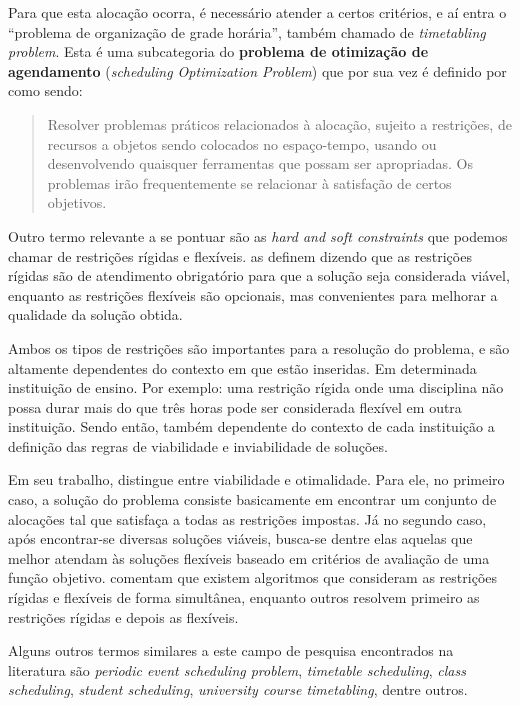Para que esta alocação ocorra, é necessário atender a certos critérios, e aí entra o ``problema de organização de grade horária'', também chamado de \textit{timetabling problem}. Esta é uma subcategoria do \textbf{problema de otimização de agendamento} (\textit{scheduling Optimization Problem}) \cite{Alencar2019} que por sua vez é definido por  como sendo:

\begin{quote}\footnotesize
  Resolver problemas práticos relacionados à alocação, sujeito a restrições, de recursos a objetos sendo colocados no espaço-tempo, usando ou desenvolvendo quaisquer ferramentas que possam ser apropriadas. Os problemas irão frequentemente se relacionar à satisfação de certos objetivos. \cite{Wren1996}
\end{quote}

Outro termo relevante a se pontuar são as \textit{hard and soft constraints} que podemos chamar de restrições rígidas e flexíveis.  as definem dizendo que as restrições rígidas são de atendimento obrigatório para que a solução seja considerada viável, enquanto as restrições flexíveis são opcionais, mas convenientes para melhorar a qualidade da solução obtida.

Ambos os tipos de restrições são importantes para a resolução do problema, e são altamente dependentes do contexto em que estão inseridas. Em determinada instituição de ensino. Por exemplo: uma restrição rígida onde uma disciplina não possa durar mais do que três horas pode ser considerada flexível em outra instituição. Sendo então, também dependente do contexto de cada instituição a definição das regras de viabilidade e inviabilidade de soluções.

Em seu trabalho,  distingue entre viabilidade e otimalidade. Para ele, no primeiro caso, a solução do problema consiste basicamente em encontrar um conjunto de alocações tal que satisfaça a todas as restrições impostas. Já no segundo caso, após encontrar-se diversas soluções viáveis, busca-se dentre elas aquelas que melhor atendam às soluções flexíveis baseado em critérios de avaliação de uma função objetivo.  comentam que existem algoritmos que consideram as restrições rígidas e flexíveis de forma simultânea, enquanto outros resolvem primeiro as restrições rígidas e depois as flexíveis.

Alguns outros termos similares a este campo de pesquisa encontrados na literatura são \textit{periodic event scheduling problem}, \textit{timetable scheduling}, \textit{class scheduling}, \textit{student scheduling}, \textit{university course timetabling}, dentre outros.

